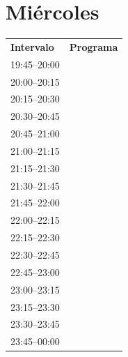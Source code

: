 \documentclass[11pt,a4paper]{article}
\begin{document}
\clearpage
\section*{Miércoles}
\begin{center}
\begin{adjustbox}{max totalsize={\textwidth}{0.82\textheight},center}
\begin{tabular}{|p{3.6cm}|p{11cm}|}
\hline
\textbf{Intervalo} & \textbf{Programa} \\
\cline{1-1}
{\centering\rule{0pt}{2.80ex}19:45--20:00} & {\centering\rule{0pt}{2.80ex}} \\
\cline{1-1}
{\centering\rule{0pt}{2.80ex}20:00--20:15} & {\centering\rule{0pt}{2.80ex}} \\
\cline{1-1}
{\centering\rule{0pt}{2.80ex}20:15--20:30} & {\centering\rule{0pt}{2.80ex}} \\
\cline{1-1}
{\centering\rule{0pt}{2.80ex}20:30--20:45} & {\centering\rule{0pt}{2.80ex}} \\
\cline{1-1}
{\centering\rule{0pt}{2.80ex}20:45--21:00} & {\centering\rule{0pt}{2.80ex}} \\
\cline{1-1}
{\centering\rule{0pt}{2.80ex}21:00--21:15} & {\centering\rule{0pt}{2.80ex}} \\
\cline{1-1}
{\centering\rule{0pt}{2.80ex}21:15--21:30} & {\centering\rule{0pt}{2.80ex}} \\
\cline{1-1}
{\centering\rule{0pt}{2.80ex}21:30--21:45} & {\centering\rule{0pt}{2.80ex}} \\
\cline{1-1}
{\centering\rule{0pt}{2.80ex}21:45--22:00} & {\centering\rule{0pt}{2.80ex}} \\
\cline{1-1}
{\centering\rule{0pt}{2.80ex}22:00--22:15} & {\centering\rule{0pt}{2.80ex}} \\
\cline{1-1}
{\centering\rule{0pt}{2.80ex}22:15--22:30} & {\centering\rule{0pt}{2.80ex}} \\
\cline{1-1}
{\centering\rule{0pt}{2.80ex}22:30--22:45} & {\centering\rule{0pt}{2.80ex}} \\
\cline{1-1}
{\centering\rule{0pt}{2.80ex}22:45--23:00} & {\centering\rule{0pt}{2.80ex}} \\
\cline{1-1}
{\centering\rule{0pt}{2.80ex}23:00--23:15} & {\centering\rule{0pt}{2.80ex}} \\
\cline{1-1}
{\centering\rule{0pt}{2.80ex}23:15--23:30} & {\centering\rule{0pt}{2.80ex}} \\
\cline{1-1}
{\centering\rule{0pt}{2.80ex}23:30--23:45} & {\centering\rule{0pt}{2.80ex}} \\
\cline{1-1}
{\centering\rule{0pt}{2.80ex}23:45--00:00} & {\centering\rule{0pt}{2.80ex}} \\
\cline{1-1}
\hline
\end{tabular}
\end{adjustbox}
\end{center}
\end{document}
